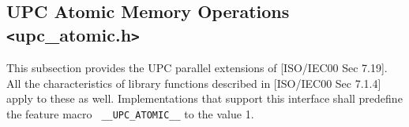 \subsection{UPC Atomic Memory Operations \texttt{<}upc\_atomic.h\texttt{>}}

\npf This subsection provides the UPC parallel extensions of [ISO/IEC00 
    Sec 7.19].  All the characteristics of library functions described
    in [ISO/IEC00 Sec 7.1.4] apply to these as well.  Implementations
    that support this interface shall predefine the feature macro {\tt
    \_\_UPC\_ATOMIC\_\_} to the value 1.
